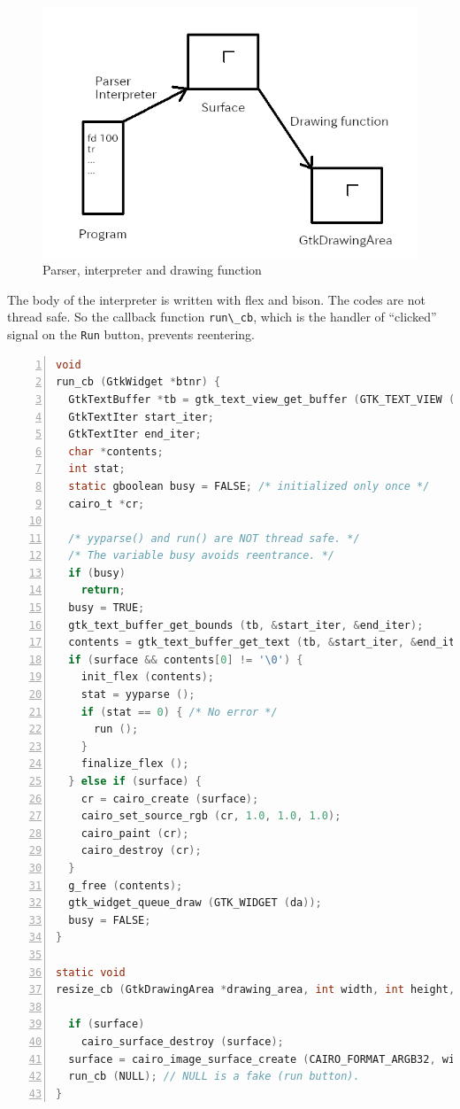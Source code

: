 \begin{figure}
\centering
\includegraphics{../image/turtle.png}
\caption{Parser, interpreter and drawing function}
\end{figure}

The body of the interpreter is written with flex and bison. The codes
are not thread safe. So the callback function
\passthrough{\lstinline!run\_cb!}, which is the handler of ``clicked''
signal on the \passthrough{\lstinline!Run!} button, prevents reentering.

\begin{lstlisting}[language=C, numbers=left]
void
run_cb (GtkWidget *btnr) {
  GtkTextBuffer *tb = gtk_text_view_get_buffer (GTK_TEXT_VIEW (tv));
  GtkTextIter start_iter;
  GtkTextIter end_iter;
  char *contents;
  int stat;
  static gboolean busy = FALSE; /* initialized only once */
  cairo_t *cr;

  /* yyparse() and run() are NOT thread safe. */
  /* The variable busy avoids reentrance. */
  if (busy)
    return;
  busy = TRUE;
  gtk_text_buffer_get_bounds (tb, &start_iter, &end_iter);
  contents = gtk_text_buffer_get_text (tb, &start_iter, &end_iter, FALSE);
  if (surface && contents[0] != '\0') {
    init_flex (contents);
    stat = yyparse ();
    if (stat == 0) { /* No error */
      run ();
    }
    finalize_flex ();
  } else if (surface) {
    cr = cairo_create (surface);
    cairo_set_source_rgb (cr, 1.0, 1.0, 1.0);
    cairo_paint (cr);
    cairo_destroy (cr);
  }
  g_free (contents);
  gtk_widget_queue_draw (GTK_WIDGET (da));
  busy = FALSE;
}

static void
resize_cb (GtkDrawingArea *drawing_area, int width, int height, gpointer user_data) {

  if (surface)
    cairo_surface_destroy (surface);
  surface = cairo_image_surface_create (CAIRO_FORMAT_ARGB32, width, height);
  run_cb (NULL); // NULL is a fake (run button).
}
\end{lstlisting}

